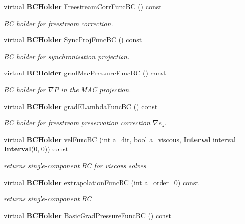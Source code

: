 \begin{DoxyCompactItemize}
virtual \textbf{ B\+C\+Holder} \hyperlink{class_phys_b_c_util_ae13f736d6b1f4bd5a306b226d7303bb3}{Freestream\+Corr\+Func\+BC} () const
\begin{DoxyCompactList}\small\item\em BC holder for freestream correction. \end{DoxyCompactList}\item 
virtual \textbf{ B\+C\+Holder} \hyperlink{class_phys_b_c_util_af775d916ab409a2231492fbb1492a94b}{Sync\+Proj\+Func\+BC} () const
\begin{DoxyCompactList}\small\item\em BC holder for synchronisation projection. \end{DoxyCompactList}\item 
virtual \textbf{ B\+C\+Holder} \hyperlink{class_phys_b_c_util_a33fc70ca77f08936d46fa64610174d5b}{grad\+Mac\+Pressure\+Func\+BC} () const
\begin{DoxyCompactList}\small\item\em BC holder for $ \nabla P $ in the M\+AC projection. \end{DoxyCompactList}\item 
virtual \textbf{ B\+C\+Holder} \hyperlink{class_phys_b_c_util_ac70d7c8b4b144cccbe0fe9d6715c5b86}{grad\+E\+Lambda\+Func\+BC} () const
\begin{DoxyCompactList}\small\item\em BC holder for freestream preservation correction $ \nabla e_\lambda $. \end{DoxyCompactList}\item 
virtual \textbf{ B\+C\+Holder} \hyperlink{class_phys_b_c_util_a68ef94f8d4002dabc19e7a24a671943e}{vel\+Func\+BC} (int a\+\_\+dir, bool a\+\_\+viscous, \textbf{ Interval} interval=\textbf{ Interval}(0, 0)) const
\begin{DoxyCompactList}\small\item\em returns single-\/component BC for viscous solves \end{DoxyCompactList}\item 
virtual \textbf{ B\+C\+Holder} \hyperlink{class_phys_b_c_util_a8dd3f2fd42f64e02bdaba7ca01952c5b}{extrapolation\+Func\+BC} (int a\+\_\+order=0) const
\begin{DoxyCompactList}\small\item\em returns single-\/component BC \end{DoxyCompactList}\item 
virtual \textbf{ B\+C\+Holder} \hyperlink{class_phys_b_c_util_ac29460ba7448a486030ba90ee246cc4f}{Basic\+Grad\+Pressure\+Func\+BC} () const

\end{DoxyCompactItemize}
